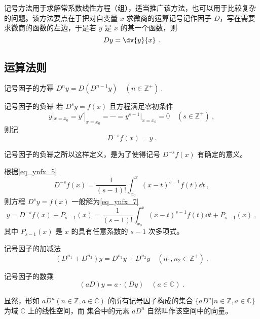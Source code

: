 
记号方法用于求解常系数线性方程（组），适当推广该方法，也可以用于比较复杂的问题。该方法要点在于把对自变量 $x$ 求微商的运算记号记作因子 $D$，写在需要求微商的函数的左边，于是若 $y$ 是 $x$ 的某一个函数，则
\begin{equation}\label{eq_Sign_10}
Dy=\dv{y}{x}~.
\end{equation}
\subsection{运算法则}
\begin{definition}{记号因子的方幂}\label{def_Sign_1}
$D^ny=D(D^{n-1}y)\quad(n\in\mathbb{Z^{+}})~.$
\end{definition}
\begin{definition}{记号因子的负幂}\label{def_Sign_2}
若 $D^sy=f(x)$ 且方程满足零初条件
\begin{equation}\label{eq_Sign_5}
y|_{x=x_0}=y'|_{x=x_0}=\cdots=y^{s-1}|_{x=x_0}=0\quad({s\in\mathbb{Z^{+}}})~,
\end{equation}
则记
\begin{equation}
D^{-s}f(x)=y~.
\end{equation}
\end{definition}
记号因子的负幂之所以这样定义，是为了使得记号 $D^{-s}f(x)$ 有确定的意义。

根据\autoref{eq_ynfx_5}~
\begin{equation}\label{eq_Sign_9}
D^{-s}f(x)=\frac{1}{(s-1)!}\int_{x_0}^x(x-t)^{s-1}f(t)\dd t~,
\end{equation}
则方程 $D^sy=f(x)$ 一般解为\autoref{eq_ynfx_7}~
\begin{equation}
y=D^{-s}f(x)+P_{s-1}(x)=\frac{1}{(s-1)!}\int_{x_0}^x(x-t)^{s-1}f(t)\dd t+P_{s-1}(x)~,
\end{equation}
其中 $P_{s-1}(x)$ 是 $x$ 的具有任意系数的 $s-1$ 次多项式。
\begin{definition}{记号因子的加减法}
\begin{equation}
(D^{n_1}+D^{n_2})y=D^{n_1}y+D^{n_2}y\quad(n_1,n_2\in \mathbb{Z^{+
}})~.
\end{equation}
\end{definition}
\begin{definition}{记号因子的数乘}
\begin{equation}
(aD)y=a\cdot(Dy)\quad(a\in\mathbb{C})~.
\end{equation}
\end{definition}
显然，形如 $aD^n(n\in \mathbb{Z},a\in\mathbb{C})$ 的所有记号因子构成的集合 $\{aD^n|n\in \mathbb{Z},a\in\mathbb{C}\}$ 为域 $\mathbb C$ 上的线性空间，而 集合中的元素 $aD^n$ 自然叫作该空间中的向量。

